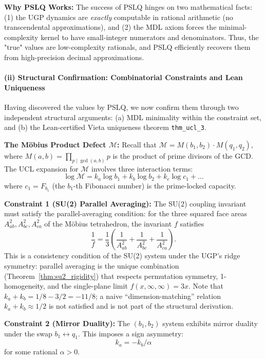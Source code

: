 \documentclass[11pt,twocolumn]{article}
\begin{document}
\textbf{Why PSLQ Works:}
The success of PSLQ hinges on two mathematical facts: (1) the UGP dynamics are \emph{exactly} computable in rational arithmetic (no transcendental approximations), and (2) the MDL axiom forces the minimal-complexity kernel to have small-integer numerators and denominators. Thus, the "true" values are low-complexity rationals, and PSLQ efficiently recovers them from high-precision decimal approximations.

\paragraph{(ii) Structural Confirmation: Combinatorial Constraints and Lean Uniqueness}

Having discovered the values by PSLQ, we now confirm them through two independent structural arguments: (a) MDL minimality within the constraint set, and (b) the Lean-certified Vieta uniqueness theorem \texttt{thm\_ucl\_3}.

\textbf{The Möbius Product Defect $\mathcal{M}$:}
Recall that $\mathcal{M} = M(b_1,b_2) \cdot M(q_1,q_2)$, where $M(a,b) = \prod_{p \mid \gcd(a,b)} p$ is the product of prime divisors of the GCD. The UCL expansion for $\mathcal{M}$ involves three interaction terms:
\[
\log\mathcal{M} = k_a\log b_1 + k_b\log b_2 + k_c\log c_1 + \ldots
\]
where $c_1 = F_{b_1}$ (the $b_1$-th Fibonacci number) is the prime-locked capacity.

\textbf{Constraint 1 (SU(2) Parallel Averaging):}
The SU(2) coupling invariant must satisfy the parallel-averaging condition: for the three squared face areas $A_{ab}^2, A_{bc}^2, A_{ca}^2$ of the Möbius tetrahedron, the invariant $f$ satisfies
\begin{equation}
\frac{1}{f} = \frac{1}{3}\!\left(\frac{1}{A_{ab}^2} + \frac{1}{A_{bc}^2} + \frac{1}{A_{ca}^2}\right).
\label{eq:parallel_avg}
\end{equation}
This is a consistency condition of the SU(2) system under the UGP's ridge symmetry: parallel averaging is the unique combination (Theorem~\ref{thm:su2_rigidity}) that respects permutation symmetry, 1-homogeneity, and the single-plane limit $f(x,\infty,\infty) = 3x$. Note that $k_a + k_b = 1/8 - 3/2 = -11/8$; a naive ``dimension-matching'' relation $k_a + k_b \approx 1/2$ is not satisfied and is not part of the structural derivation.

\textbf{Constraint 2 (Mirror Duality):}
The $(b_1, b_2)$ system exhibits mirror duality under the swap $b_1 \leftrightarrow q_1$. This imposes a sign asymmetry:
\begin{equation}
k_a = -k_b / \alpha
\label{eq:mirror_constraint}
\end{equation}
for some rational $\alpha > 0$.
\end{document}

